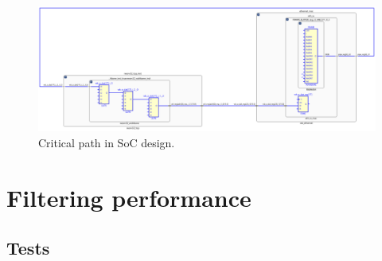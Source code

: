 \begin{figure}[h]
    \centering
    \includegraphics[width=1\textwidth]{Images/critical_path_delay_schematic.png}
    \caption[Critical path in SoC design]{Critical path in SoC design.}
    \label{fig:crit_path}
\end{figure}









\section{Filtering performance}

\subsection{Tests}


